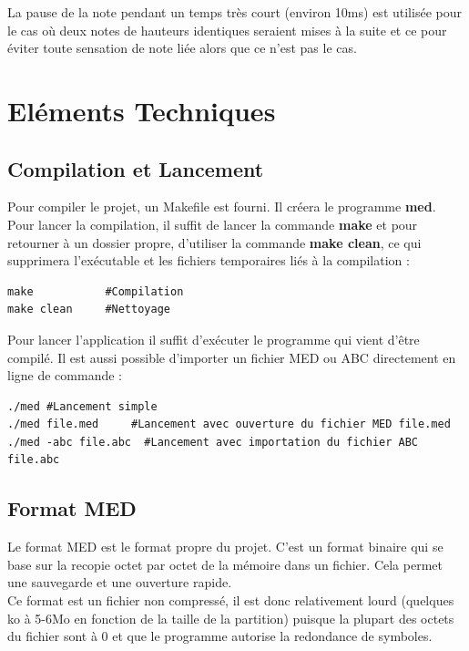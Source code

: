 \documentclass[12pt]{report}
\begin{document}
La pause de la note pendant un temps très court (environ 10ms) est utilisée pour le cas où deux notes de hauteurs identiques seraient mises à la suite et ce pour éviter toute sensation de note liée alors que
ce n'est pas le cas.\\



\newpage
\chapter{Eléments Techniques}
\section{Compilation et Lancement}
Pour compiler le projet, un Makefile est fourni. Il créera le programme \textbf{med}. Pour lancer la compilation, 
il suffit de lancer la commande \textbf{make} et pour retourner à un dossier propre, d'utiliser la commande \textbf{make clean},
ce qui supprimera l'exécutable et les fichiers temporaires liés à la compilation :\\
\lstset{style=Bash}
\begin{lstlisting}
make 		   #Compilation
make clean 	   #Nettoyage
\end{lstlisting}
\vskip 0.1in
Pour lancer l'application il suffit d'exécuter le programme qui vient d'être compilé. Il est aussi possible d'importer un fichier MED ou ABC directement en ligne de commande :\\
\begin{lstlisting}
./med #Lancement simple
./med file.med     #Lancement avec ouverture du fichier MED file.med
./med -abc file.abc  #Lancement avec importation du fichier ABC file.abc
\end{lstlisting}

\section{Format MED}
Le format MED est le format propre du projet. C'est un format binaire qui se base sur la recopie octet par octet de la mémoire dans un fichier. Cela permet une sauvegarde et une ouverture rapide.\\
Ce format est un fichier non compressé, il est donc relativement lourd (quelques ko à 5-6Mo en fonction de la taille de la partition) puisque la plupart des octets du fichier sont à 0 et que le programme
autorise la redondance de symboles. \\
\end{document}
